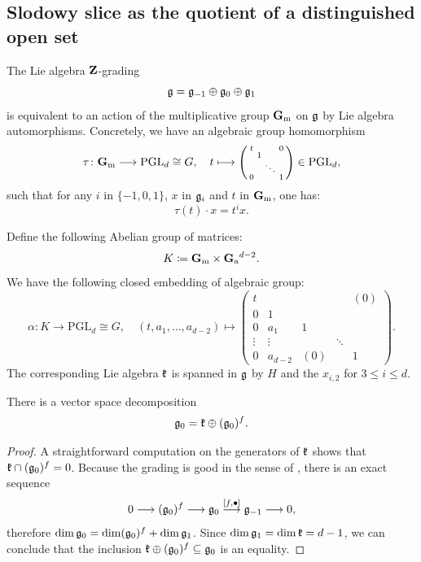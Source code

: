 \subsection{Slodowy slice as the quotient of a distinguished open set} \label{subsection:slodowy-quotient-open}

The Lie algebra $\mathbf{Z}$-grading
\[ \mathfrak g = \mathfrak g_{-1} \oplus \mathfrak g_0 \oplus \mathfrak g_1 \]
is equivalent to an action of the multiplicative group $\mathbf{G}_\mathrm{m}$ on $\mathfrak g$ by Lie algebra automorphisms. Concretely, we have an algebraic group homomorphism
\[ \tau \colon \mathbf{G}_\mathrm{m} \longrightarrow \operatorname{PGL}_d \cong G, \quad t \longmapsto \left(\begin{smallmatrix}
	t & & & 0 \\
	& 1 & & \\
	& & \ddots & \\
	0 & & & 1
\end{smallmatrix}\right) \in \mathrm{PGL}_d, \]
such that for any $i$ in $\{-1, 0, 1\}$, $x$ in $\mathfrak g_i$ and $t$ in $\mathbf{G}_\mathrm{m}$, one has:
\[ \tau(t) \cdot x = t^i x. \]

Define the following Abelian group of matrices:
\[ K \coloneqq \mathbf{G}_\mathrm{m} \times \mathbf{G}_\mathrm{a}{}^{d-2}. \]
We have the following closed embedding of algebraic group:
\[ \alpha \colon K \longrightarrow \mathrm{PGL}_d \cong G, \quad (t, a_1, \dots, a_{d-2}) \longmapsto \left(\begin{smallmatrix}
	t & & & & (0) \\
	0 & 1 & &  & \\
	0 & a_1 & 1  & & \\
	\vdots & \vdots & & \ddots &  \\
	0 & a_{d-2} & (0) & & 1
\end{smallmatrix}\right). \]
The corresponding Lie algebra $\mathfrak k$ is spanned in $\mathfrak g$ by $H$ and the $x_{i,2}$ for $3 \leqslant i \leqslant d$.

\begin{lemma} \label{lemma:afk}
	There is a vector space decomposition
	\[ \mathfrak g_0 = \mathfrak k \oplus (\mathfrak g_0)^f. \]	
\end{lemma}

\begin{proof}
	A straightforward computation on the generators of $\mathfrak k$ shows that $\mathfrak k \cap (\mathfrak g_0)^f = 0$. Because the grading is good in the sense of \cite{elashvili2005classification,brundan2007good}, there is an exact sequence
	\[ 0 \longrightarrow (\mathfrak g_0)^f \longrightarrow \mathfrak g_0 \overset{[f, \bullet]}{\longrightarrow} \mathfrak g_{-1} \longrightarrow 0, \]
	therefore $\dim \mathfrak g_0 = \dim(\mathfrak g_0)^f + \dim \mathfrak g_1$. Since $\dim \mathfrak g_1 = \dim \mathfrak k = d - 1$, we can conclude that the inclusion $\mathfrak k \oplus (\mathfrak g_0)^f \subseteq \mathfrak g_0$ is an equality.
\end{proof}

